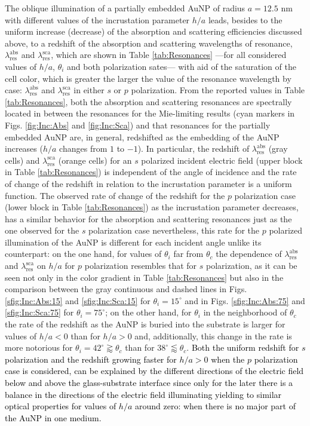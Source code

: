 The oblique illumination of a partially embedded AuNP of radius $a=12.5$ nm with different values of the incrustation parameter $h/a$ leads, besides to the uniform increase (decrease) of the absorption and scattering efficiencies discussed above, to a redshift of the absorption and scattering wavelengths of resonance, $\lambda_\text{res}^\text{abs}$ and $\lambda_\text{res}^\text{sca}$, which are shown in Table \ref{tab:Resonances} ---for all considered values of $h/a$, $\theta_i$ and both polarization sates--- with aid of the saturation of the cell color, which is greater the larger the value of the resonance wavelength by case: $\lambda_\text{res}^\text{abs}$ and $\lambda_\text{res}^\text{sca}$ in either $s$ or $p$ polarization. From the reported values in Table \ref{tab:Resonances}, both the absorption and scattering resonances are spectrally located in between the resonances for the Mie-limiting results (cyan markers in Figs. \ref{fig:Inc:Abs} and \ref{fig:Inc:Sca}) and that resonances for the partially embedded AuNP are, in general, redshifted as the embedding of the AuNP increases ($h/a$ changes from $1$ to $-1$). In particular, the redshift of $\lambda_\text{res}^\text{abs}$ (gray cells) and $\lambda_\text{res}^\text{sca}$ (orange cells) for an $s$ polarized incident electric field (upper block in Table \ref{tab:Resonances}) is independent of the angle of incidence and the rate of change of the redshift in relation to the incrustation parameter is a uniform function. The observed rate of change of the redshift for the $p$ polarization case (lower block in Table \ref{tab:Resonances}) as the incrustation parameter decreases, has a similar behavior for the absorption and scattering resonances just as the one observed for the $s$ polarization case nevertheless, this rate for the $p$ polarized illumination of the AuNP is different for each incident angle unlike its counterpart: on the one hand, for values of $\theta_i$ far from $\theta_c$ the dependence of  $\lambda_\text{res}^\text{abs}$ and $\lambda_\text{res}^\text{sca}$ on $h/a$ for $p$ polarization resembles that for $s$ polarization, as it can be seen not only in the color gradient in Table \ref{tab:Resonances} but also in the comparison between the gray continuous and dashed lines in Figs. \ref{sfig:Inc:Abs:15} and \ref{sfig:Inc:Sca:15} for $\theta_i = 15^\circ$ and in Figs. \ref{sfig:Inc:Abs:75} and \ref{sfig:Inc:Sca:75} for $\theta_i = 75^\circ$; on the other hand, for $\theta_i$ in the neighborhood of $\theta_c$ the rate of the redshift as the AuNP is buried into the substrate is larger for values of $h/a<0$ than for $h/a>0$ and, additionally, this change in the rate is more notorious for $\theta_i = 42^\circ\gtrapprox \theta_c$ than for $38^\circ\lessapprox \theta_c$. \textcolor{black}{Both the uniform redshift for $s$ polarization and the redshift growing faster for $h/a>0$ when the $p$ polarization case is considered, can be explained by the different directions of the electric field below and above the glass-substrate interface since only for the later there is a balance in the directions of the electric field illuminating yielding to similar optical properties for values of $h/a$  around zero: when there is no major part of the AuNP in one medium.}

